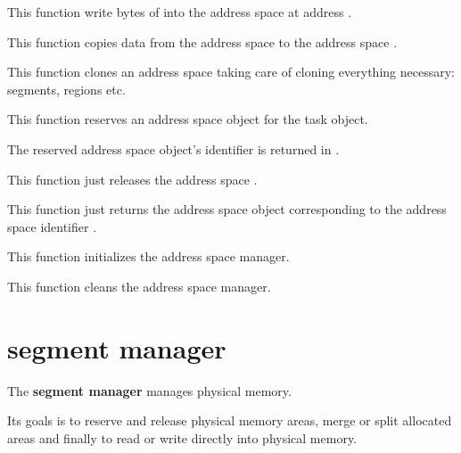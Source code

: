 	 {
	   This function write  bytes of 
	   into the address space  at address .
	 }

	 {
	   This function copies data from the address space
	    to the address space .
	 }

	 {
	   This function clones an address space taking care of cloning
	   everything necessary: segments, regions etc.
	 }

	 {
	   This function reserves an address space object for the
	   task  object.

	   The reserved address space object's identifier is returned
	   in .
	 }

	 {
	   This function just releases the address space .
	 }

	 {
	   This function just returns the address space object
	   corresponding to the address space identifier .
	 }

	 {
	   This function initializes the address space manager.
	 }

	 {
	   This function cleans the address space manager.
	 }

%
%

\section{segment manager}

The \textbf{segment manager} manages physical memory.

Its goals is to reserve and release physical memory areas, merge or split
allocated areas and finally to read or write directly into physical memory.

